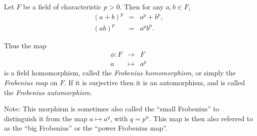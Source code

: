 \documentclass{article}
\begin{document}
Let $F$ be a field of characteristic $p>0$. Then for any $a, b \in F$, 
\begin{eqnarray*}
(a + b)^p &=& a^p + b^p,
\\ (ab)^p &=& a^p b^p.
\end{eqnarray*}

Thus the map
$$
\begin{matrix}\phi: F &\to& F 
\\ a &\mapsto& a^p
\end{matrix}
$$
is a field homomorphism, called the \emph{Frobenius homomorphism}, or simply the \emph{Frobenius map} on $F$.
If it is surjective then it is an automorphism, and is called the \emph{Frobenius automorphism}.

Note: This morphism is sometimes also called the ``small Frobenius'' to distinguish it from the map $a \mapsto a^q$, with $q=p^n$. This map is then also referred to as the ``big Frobenius'' or the ``power Frobenius map''.
\end{document}
